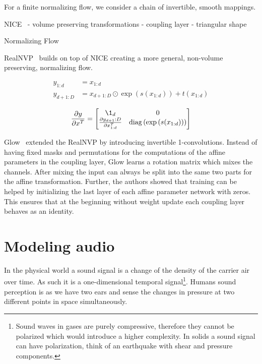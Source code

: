 For a finite normalizing flow, we consider a chain of invertible, smooth mappings.

NICE~\cite{dinhNICE2015}
- volume preserving transformations
- coupling layer
- triangular shape

Normalizing Flow~\cite{rezendeVariational2016}


RealNVP~\cite{dinhDensity2017} builds on top of NICE creating a more general, non-volume preserving, normalizing flow.

\begin{align}
    y_{1:d} &= x_{1:d}\\
    y_{d+1:D} &= x_{d+1:D} \odot \exp{(s(x_{1:d}))} + t(x_{1:d})
\end{align}

\begin{equation}
    \pf{y}{x^T} = \bM{\1_d & 0 \\ \pf{y_{d+1}:D}{x^T_{1:d}} & \diag{\left(\exp{(s(x_{1:d}))}\right)}}
\end{equation}

Glow~\cite{kingmaGlow2018} extended the RealNVP by introducing invertible 1-convolutions. Instead of having fixed masks and permutations for the computations of the affine parameters in the coupling layer, Glow learns a rotation matrix which mixes the channels. After mixing the input can always be split into the same two parts for the affine transformation. Further, the authors showed that training can be helped by initializing the last layer of each affine parameter network with zeros. This ensures that at the beginning without weight update each coupling layer behaves as an identity.

\section{Modeling audio}%
\label{sec:audio}
In the physical world a sound signal is a change of the density of the carrier air over time. As such it is a one-dimensional temporal signal\footnote{Sound waves in gases are purely compressive, therefore they cannot be polarized which would introduce a higher complexity. In solids a sound signal can have polarization, think of an earthquake with shear and pressure components.}. Humans sound perception is  as we have two ears and sense the changes in pressure at two different points in space simultaneously.

